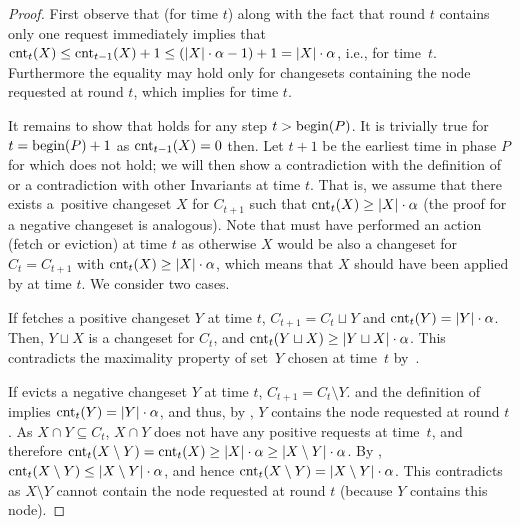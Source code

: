 \begin{proof}
First observe that  (for time $t$) along with the
fact that round $t$ contains only one request immediately implies that
$\textrm{cnt}_t(X) \leq \textrm{cnt}_{t-1}(X) + 1 \leq (|X| \cdot \alpha - 1) + 1 = |X|
\cdot \alpha$, i.e.,  for time~$t$. Furthermore the equality may
hold only for changesets containing the node requested at round $t$, which
implies  for time $t$.

It remains to show that  holds for any step $t >
\textrm{begin}(P)$. It is trivially true for $t = \textrm{begin}(P)+1$ 
as $\textrm{cnt}_{t-1}(X) = 0$ then. Let $t+1$ be the earliest time in phase $P$ for
which  does not hold; we will then show a
contradiction with the definition of \ALG or a contradiction with other
Invariants at time $t$. That is, we assume that there exists a~positive
changeset $X$ for $C_{t+1}$ such that $\textrm{cnt}_t(X) \geq |X| \cdot \alpha$ (the
proof for a negative changeset is analogous). Note that \ALG must have
performed an action (fetch or eviction) at time $t$ as otherwise $X$ would be
also  a changeset for $C_t = C_{t+1}$ with $\textrm{cnt}_t(X) \geq |X| \cdot \alpha$,
which means that $X$ should have been applied by \ALG at time $t$. We consider
two cases.

If \ALG fetches a positive changeset $Y$ at time $t$, $C_{t+1} = C_t \sqcup Y$
and $\textrm{cnt}_t(Y) = |Y|\cdot\alpha$. Then, $Y \sqcup X$ is a changeset for $C_t$,
and $\textrm{cnt}_t(Y \sqcup X) \geq |Y \sqcup X| \cdot \alpha$. This contradicts
the maximality property of set~$Y$ chosen at time~$t$ by~\ALG.

If \ALG evicts a negative changeset $Y$ at time $t$, $C_{t+1} = C_t \setminus
Y$.  and the definition of \ALG implies $\textrm{cnt}_t(Y) =
|Y| \cdot \alpha$, and thus, by , $Y$ contains
the node requested at round $t$. As $X \cap Y \subseteq C_t$, \mbox{$X \cap Y$} does
not have any positive requests at time~$t$, and therefore $\textrm{cnt}_t(X \setminus
Y) = \textrm{cnt}_t(X) \geq |X| \cdot \alpha \geq |X \setminus Y| \cdot \alpha$. By
, $\textrm{cnt}_t(X \setminus Y) \leq |X \setminus Y|
\cdot \alpha$, and hence $\textrm{cnt}_t(X \setminus Y) = |X \setminus Y| \cdot
\alpha$. This contradicts  as $X \setminus Y$
cannot contain the node requested at round $t$ (because $Y$ contains this
node).
\end{proof}


